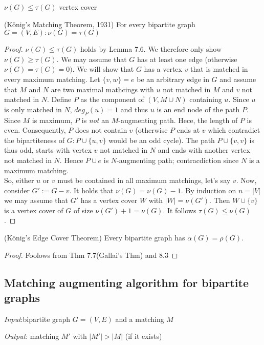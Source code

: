 $\nu(G) \leq \tau(G)$ vertex cover 
\begin{thm}(König's Matching Theorem, 1931)
For every bipartite graph $G=(V,E): \nu(G)=\tau(G)$ 
\end{thm}
\begin{proof} $\nu(G) \leq \tau(G)$ holds by Lemma 7.6. %
We therefore only show $\nu(G) \geq \tau(G)$.
We may assume that $G$ has at least one edge (otherwise $\nu(G)=\tau(G)=0).$ We will show that $G$ has a vertex $v$ that is matched in every maximum matching. Let $\{v,w\}=e$ be an arbitrary edge in $G$ and assume that $M$ and $N$ are two maximal mathcings with $u$ not matched in $M$ and $v$ not matched in $N$. Define $P$ as the component of $(V,M \cup N)$ containing $u$.
Since $u$ is only matched in $N$, $deg_P(u)=1$ and thus $u$ is an end node of the path $P$. Since $M$ is maximum, $P$ is \emph{not} an $M$-augmenting path. Hece, the length of $P$ is even. Consequently, $P$ does not contain $v$ (otherwise $P$ ends at $v$ which contradict the bipartiteness of $G:P\cup \{u,v\}$ would be an odd cycle).
The path $P \cup \{v,v\}$ is thus odd, starts with vertex $v$ not matched in $N$ and ends with another vertex not matched in $N$. Hence $P \cup e$ is $N$-augmenting path; contracdiction since $N$ is a maximum matching.\\
So, either $u$ or $v$ must be contained in all maximum matchings, let's say $v$. Now, consider $G':=G-v$. It holds that $\nu(G)=\nu(G)-1$. By induction on $n=|V|$ we may assume that $G'$ has a vertex cover $W$ with $|W|=\nu(G')$. Then $W \cup \{v\}$ is a vertex cover of $G$ of size $\nu(G')+1=\nu(G)$. It follows $\tau(G)\leq \nu(G)$.
\end{proof}

\begin{cor}(König's Edge Cover Theorem)
Every bipartite graph has $\alpha(G)=\rho(G)$.
\end{cor}
\begin{proof}
Foolows from Thm 7.7(Gallai's Thm) and 8.3 %
\end{proof}

\subsection*{Matching augmenting algorithm for bipartite graphs}

\emph{Input}:bipartite graph $G=(V,E)$ and a matching $M$

\emph{Output}: matching $M'$ with $|M'| > |M|$ (if it exists)

